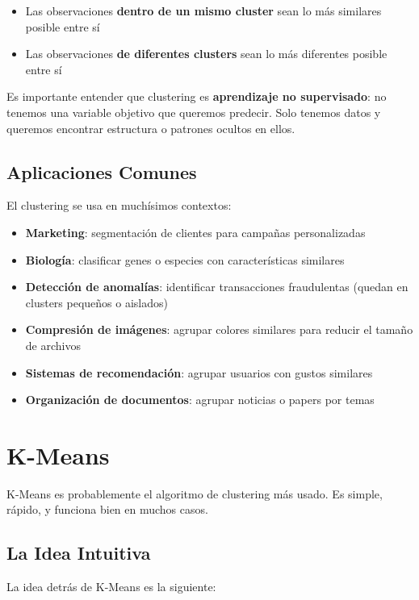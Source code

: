 \documentclass[12pt]{article}
\begin{document}
\begin{itemize}
    \item Las observaciones \textbf{dentro de un mismo cluster} sean lo más similares posible entre sí
    \item Las observaciones \textbf{de diferentes clusters} sean lo más diferentes posible entre sí
\end{itemize}

Es importante entender que clustering es \textbf{aprendizaje no supervisado}: no tenemos una variable objetivo que queremos predecir. Solo tenemos datos y queremos encontrar estructura o patrones ocultos en ellos.

\subsection{Aplicaciones Comunes}

El clustering se usa en muchísimos contextos:

\begin{itemize}
    \item \textbf{Marketing}: segmentación de clientes para campañas personalizadas
    \item \textbf{Biología}: clasificar genes o especies con características similares
    \item \textbf{Detección de anomalías}: identificar transacciones fraudulentas (quedan en clusters pequeños o aislados)
    \item \textbf{Compresión de imágenes}: agrupar colores similares para reducir el tamaño de archivos
    \item \textbf{Sistemas de recomendación}: agrupar usuarios con gustos similares
    \item \textbf{Organización de documentos}: agrupar noticias o papers por temas
\end{itemize}

\section{K-Means}

K-Means es probablemente el algoritmo de clustering más usado. Es simple, rápido, y funciona bien en muchos casos.

\subsection{La Idea Intuitiva}

La idea detrás de K-Means es la siguiente:
\end{document}
